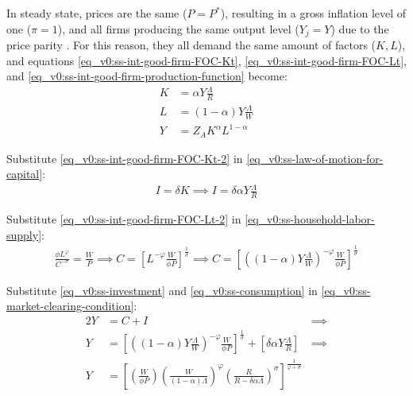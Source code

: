 \documentclass[
thesis.tex
]{subfiles}
\begin{document}
	In steady state, prices are the same ($P = P^\ast$), resulting in a gross inflation level of one ($\pi=1$), and all firms producing the same output level ($Y_j=Y$) due to the price parity \cite[Lecture 13, p.12]{solis-garcia_ucb_2022}. For this reason, they all demand the same amount of factors ($K,L$), and equations \ref{eq_v0:ss-int-good-firm-FOC-Kt}, \ref{eq_v0:ss-int-good-firm-FOC-Lt}, and \ref{eq_v0:ss-int-good-firm-production-function} become:
	\begin{align}
		K &= \alpha Y \frac{\Lambda}{R} \label{eq_v0:ss-int-good-firm-FOC-Kt-2} \\
		L &= (1-\alpha) Y \frac{\Lambda}{W} \label{eq_v0:ss-int-good-firm-FOC-Lt-2} \\
		Y &= Z_{A} K^\alpha L^{1-\alpha} \label{eq_v0:ss-int-good-firm-production-function-2}
	\end{align}
	
	Substitute \ref{eq_v0:ss-int-good-firm-FOC-Kt-2} in \ref{eq_v0:ss-law-of-motion-for-capital}:
	\begin{align}
		\label{eq_v0:ss-investment}
		I = \delta K \implies I = \delta \alpha Y \frac{\Lambda}{R}
	\end{align}
	
	Substitute \ref{eq_v0:ss-int-good-firm-FOC-Lt-2} in \ref{eq_v0:ss-household-labor-supply}:
	\begin{align}
		\label{eq_v0:ss-consumption}
		\frac{\phi L^{\varphi}}{C^{-\sigma}} = \frac{W}{P}
		\implies
		C = \left[ L^{-\varphi} \frac{W}{\phi P} \right]^{\frac{1}{\sigma}}
		\implies
		C = \left[ \left( (1-\alpha) Y \frac{\Lambda}{W} \right)^{-\varphi} \frac{W}{\phi P} \right]^{\frac{1}{\sigma}}
	\end{align}
	
	Substitute \ref{eq_v0:ss-investment} and \ref{eq_v0:ss-consumption} in \ref{eq_v0:ss-market-clearing-condition}:
	\begin{alignat}{2}
		Y &= C + I &\implies \nonumber \\
		Y &= \left[ \left( (1-\alpha) Y \frac{\Lambda}{W} \right)^{-\varphi} \frac{W}{\phi P} \right]^{\frac{1}{\sigma}} + \left[ \delta \alpha Y \frac{\Lambda}{R} \right] &\implies \nonumber \\
		Y &=\left[
		\left( \frac{W}{\phi P}                \right)
		\left( \frac{W}{(1-\alpha)\Lambda}     \right)^\varphi
		\left( \frac{R}{R-\delta\alpha\Lambda} \right)^\sigma
		\right]^\frac{1}{\varphi+\sigma} & \label{eq_v0:ss-production}
	\end{alignat}
	
\end{document}
